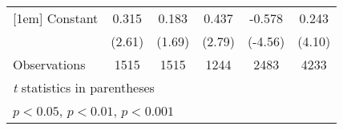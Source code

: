 {\begin{tabular}{l*{5}{c}}
[1em]
Constant        &    0.315\sym{*}  &    0.183         &    0.437\sym{**} &   -0.578\sym{***}&    0.243\sym{***}\\
                &   (2.61)         &   (1.69)         &   (2.79)         &  (-4.56)         &   (4.10)         \\
\hline
Observations    &     1515         &     1515         &     1244         &     2483         &     4233         \\
\hline\hline
\multicolumn{6}{l}{\footnotesize \textit{t} statistics in parentheses}\\
\multicolumn{6}{l}{\footnotesize \sym{*} \(p<0.05\), \sym{**} \(p<0.01\), \sym{***} \(p<0.001\)}\\
\end{tabular}
}

